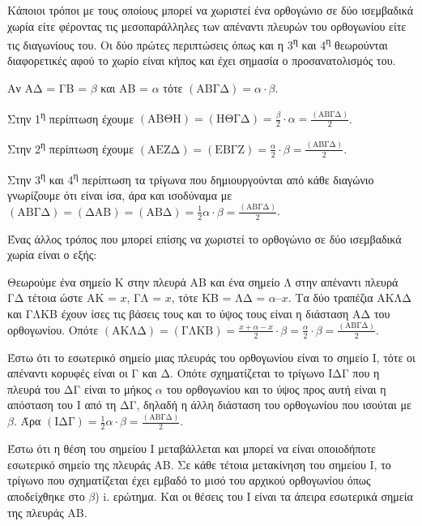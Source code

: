 \begin{alist}
\item Κάποιοι τρόποι με τους οποίους μπορεί να χωριστεί ένα ορθογώνιο σε δύο ισεμβαδικά χωρία είτε φέροντας τις μεσοπαράλληλες των απέναντι πλευρών του ορθογωνίου είτε τις διαγωνίους του. Οι δύο πρώτες περιπτώσεις όπως και η 3\textsuperscript{η} και 4\textsuperscript{η} θεωρούνται διαφορετικές αφού το χωρίο είναι κήπος και έχει σημασία ο προσανατολισμός του.

Αν ΑΔ = ΓΒ = $\beta$ και ΑΒ = $\alpha$ τότε $(\text{ΑΒΓΔ}) = \alpha \cdot \beta$.

Στην 1\textsuperscript{η} περίπτωση έχουμε $(\text{ΑΒΘΗ}) = (\text{ΗΘΓΔ}) = \frac{\beta}{2} \cdot \alpha = \frac{(\text{ΑΒΓΔ})}{2}$.

Στην 2\textsuperscript{η} περίπτωση έχουμε $(\text{ΑΕΖΔ}) = (\text{ΕΒΓΖ}) = \frac{\alpha}{2} \cdot \beta = \frac{(\text{ΑΒΓΔ})}{2}$.

Στην 3\textsuperscript{η} και 4\textsuperscript{η} περίπτωση τα τρίγωνα που δημιουργούνται από κάθε διαγώνιο γνωρίζουμε ότι είναι ίσα, άρα και ισοδύναμα με $(\text{ΑΒΓΔ}) = (\text{ΔΑΒ}) = (\text{ΑΒΔ}) = \frac{1}{2}\alpha \cdot \beta = \frac{(\text{ΑΒΓΔ})}{2}$.

Ένας άλλος τρόπος που μπορεί επίσης να χωριστεί το ορθογώνιο σε δύο ισεμβαδικά χωρία είναι ο εξής:

\item
\begin{rlist}
\item Θεωρούμε ένα σημείο K στην πλευρά ΑΒ και ένα σημείο Λ στην απέναντι πλευρά ΓΔ τέτοια ώστε ΑΚ = $x$, ΓΛ = $x$, τότε ΚΒ = ΛΔ = $\alpha – x$. Τα δύο τραπέζια ΑΚΛΔ και ΓΛΚΒ έχουν ίσες τις βάσεις τους και το ύψος τους είναι η διάσταση ΑΔ του ορθογωνίου. Οπότε $(\text{ΑΚΛΔ}) = (\text{ΓΛΚΒ}) = \frac{x+\alpha-x}{2} \cdot \beta = \frac{\alpha}{2} \cdot \beta = \frac{(\text{ΑΒΓΔ})}{2}$.
\item Έστω ότι το εσωτερικό σημείο μιας πλευράς του ορθογωνίου είναι το σημείο I, τότε οι απέναντι κορυφές είναι οι Γ και Δ. Οπότε σχηματίζεται το τρίγωνο ΙΔΓ που η πλευρά του ΔΓ είναι το μήκος $\alpha$ του ορθογωνίου και το ύψος προς αυτή είναι η απόσταση του I από τη ΔΓ, δηλαδή η άλλη διάσταση του ορθογωνίου που ισούται με $\beta$. Άρα $(\text{ΙΔΓ}) = \frac{1}{2} \alpha \cdot \beta = \frac{(\text{ΑΒΓΔ})}{2}$.
\item Έστω ότι η θέση του σημείου I μεταβάλλεται και μπορεί να είναι οποιοδήποτε εσωτερικό σημείο της πλευράς ΑΒ. Σε κάθε τέτοια μετακίνηση του σημείου I, το τρίγωνο που σχηματίζεται έχει εμβαδό το μισό του αρχικού ορθογωνίου όπως αποδείχθηκε στο $\beta$) i. ερώτημα. Και οι θέσεις του I είναι τα άπειρα εσωτερικά σημεία της πλευράς ΑΒ.
\end{rlist}
\end{alist}